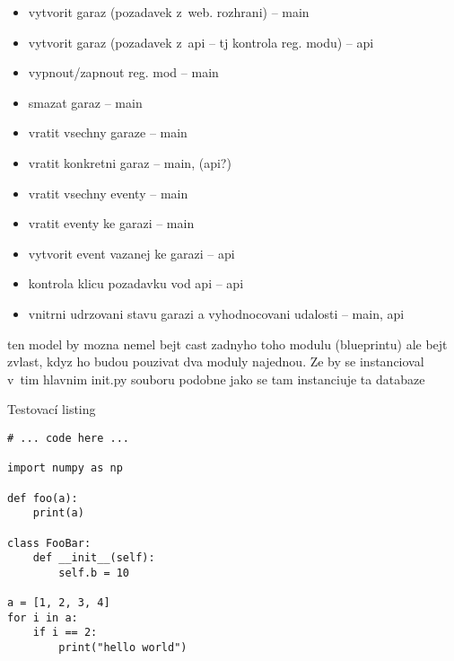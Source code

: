 \begin{itemize}
    \item vytvorit garaz (pozadavek z~web. rozhrani) -- main
    \item vytvorit garaz (pozadavek z~api -- tj kontrola reg. modu) -- api
    \item vypnout/zapnout reg. mod -- main
    \item smazat garaz -- main
    \item vratit vsechny garaze -- main
    \item vratit konkretni garaz -- main, (api?)
    \item vratit vsechny eventy -- main
    \item vratit eventy ke garazi -- main
    \item vytvorit event vazanej ke garazi -- api
    \item kontrola klicu pozadavku vod api -- api
    \item vnitrni udrzovani stavu garazi a vyhodnocovani udalosti -- main, api
\end{itemize}

ten model by mozna nemel bejt cast zadnyho toho modulu (blueprintu) ale bejt zvlast, kdyz ho budou pouzivat dva moduly najednou. Ze by se instancioval v~tim hlavnim init.py souboru podobne jako se tam instanciuje ta databaze


\begin{listing}[htbp]
\caption{\label{code:foo} Testovací listing}
\begin{verbatim}
# ... code here ...

import numpy as np

def foo(a):
    print(a)

class FooBar:
    def __init__(self):
        self.b = 10

a = [1, 2, 3, 4]
for i in a:
    if i == 2:
        print("hello world")
\end{verbatim}
\end{listing}